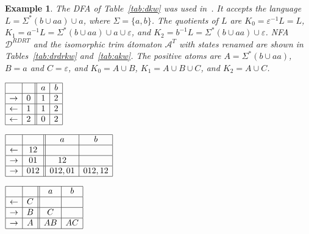 \documentclass[preprint,12pt]{elsarticle}
\newcommand{\eps}{\varepsilon}
\newcommand{\Sig}{\Sigma}
\newcommand{\cA}{{\mathcal A}}
\newcommand{\cD}{{\mathcal D}}
\newcommand{\rev}{R}
\newcommand{\deter}{D}
\newcommand{\trim}{T}
\newtheorem{example}{Example}
\begin{document}
\begin{example}
\label{ex:reducedatomic}
The DFA of Table~\ref{tab:dkw} was used in~\cite{KaWe70}. 
It accepts the language $L=\Sig^*(b\cup aa) \cup a$, where $\Sig=\{a,b\}$. 
The quotients of $L$ are
$K_0=\eps^{-1}L=L$, 
$K_1=a^{-1}L=\Sig^*(b\cup aa) \cup a \cup \eps$, and
$K_2=b^{-1}L=\Sig^*(b\cup aa) \cup \eps$.
NFA $\cD^{\rev\deter\rev\trim}$ and the isomorphic trim \'atomaton $\cA^\trim$ with states renamed  are shown in Tables~\ref{tab:drdrkw} and~\ref{tab:akw}.
The positive atoms are
$A=\Sig^*(b\cup aa)$, $B=a$ and $C=\eps$, and
$K_0=A\cup B$, 
$K_1=A\cup B\cup C$,
and $K_2=A \cup C$.


\begin{table}[b]
\begin{minipage}[b]{0.25\linewidth}
\caption{$\cD$.}
\label{tab:dkw}
{\footnotesize
\begin{center}
$
\begin{array}{|c| c||c| c| }    
\hline
& 
&  a  & b  \\
\hline  
\rightarrow & 0
& 1 & 2 \\
\hline  
\leftarrow& 1
&  1  & 2 \\
\hline  
\leftarrow & 2
 &  0 &  2  \\
\hline  
\end{array}
$
\end{center}}
\end{minipage}
\hspace{0.2cm}
\begin{minipage}[b]{0.3\linewidth}
\caption{$\cD^{\rev\deter\rev\trim}$.}
\label{tab:drdrkw}
{\footnotesize
\begin{center}
$
\begin{array}{|c| c||c| c| }    
\hline
&  
& a & b  \\
\hline  
\leftarrow & 12
& &  \\
\hline  
\rightarrow & 01
&  12 &   \\
\hline  
\rightarrow & 012 
&  012,01  & 012,12   \\
\hline  
\end{array}
$
\end{center}}
\end{minipage}
\hspace{1cm}
\begin{minipage}[b]{0.25\linewidth}
\caption{$\cA^ \trim$.}
\label{tab:akw}
{\footnotesize
\begin{center}
$
\begin{array}{|c| c||c| c| }    
\hline
&
& a & b    \\
\hline  
\leftarrow & C
& &  \\
\hline  
\rightarrow & B
&  C &   \\
\hline  
\rightarrow & A 
&  AB  & AC  \\
\hline  
\end{array}
$
\end{center}}
\end{minipage}
\end{table}



\end{example}
\end{document}
